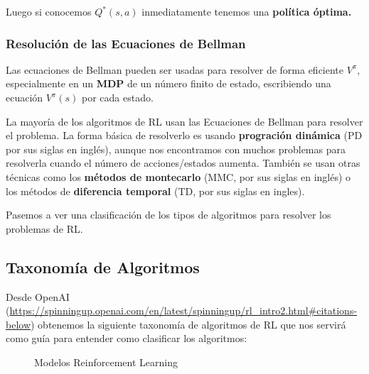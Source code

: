 \documentclass[
  a4paper,
  DIV=11,
  numbers=noendperiod]{scrreprt}
\begin{document}
Luego si conocemos \(Q^*(s,a)\) inmediatamente tenemos una
\textbf{política óptima.}

\subsubsection{Resolución de las Ecuaciones de
Bellman}\label{resoluciuxf3n-de-las-ecuaciones-de-bellman}

Las ecuaciones de Bellman pueden ser usadas para resolver de forma
eficiente \(V^\pi\), especialmente en un \textbf{MDP} de un número
finito de estado, escribiendo una ecuación \(V^\pi (s)\) por cada
estado.

La mayoría de los algoritmos de RL usan las Ecuaciones de Bellman para
resolver el problema. La forma básica de resolverlo es usando
\textbf{progración dinámica} (PD por sus siglas en inglés), aunque nos
encontramos con muchos problemas para resolverla cuando el número de
acciones/estados aumenta. También se usan otras técnicas como los
\textbf{métodos de montecarlo} (MMC, por sus siglas en inglés) o los
métodos de \textbf{diferencia temporal} (TD, por sus siglas en ingles).

Pasemos a ver una clasificación de los tipos de algoritmos para resolver
los problemas de RL.

\subsection{Taxonomía de Algoritmos}\label{taxonomuxeda-de-algoritmos}

Desde OpenAI
(\url{https://spinningup.openai.com/en/latest/spinningup/rl_intro2.html\#citations-below})
obtenemos la siguiente taxonomía de algoritmos de RL que nos servirá
como guía para entender como clasificar los algoritmos:

\begin{figure}


\caption{\label{fig-rl_algorithms}Modelos Reinforcement Learning}

\end{figure}%
\end{document}
